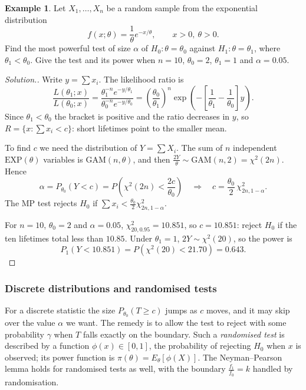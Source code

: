 \documentclass[12pt,a4paper]{report}
\theoremstyle{definition}
\newtheorem{example}[thm]{Example}
\theoremstyle{plain}
\newenvironment{solution}
  {\renewcommand{\qedsymbol}{}\begin{proof}[\textit{Solution}.]}
  {\end{proof}}
\begin{document}
\begin{example}
\label{ex:mpexponential}
Let $X_1,\dots,X_n$ be a random sample from the exponential distribution
\[f(x;\theta) = \frac{1}{\theta}e^{-x/\theta},\qquad x>0,\ \theta>0 .\]
Find the most powerful test of size $\alpha$ of $H_0\colon\theta = \theta_0$
against $H_1\colon\theta = \theta_1$, where $\theta_1<\theta_0$. Give the test
and its power when $n = 10$, $\theta_0 = 2$, $\theta_1 = 1$ and $\alpha = 0.05$.
\end{example}

\begin{solution}
Write $y = \sum x_i$. The likelihood ratio is
\[\frac{L(\theta_1;x)}{L(\theta_0;x)} = \frac{\theta_1^{-n}e^{-y/\theta_1}}{\theta_0^{-n}e^{-y/\theta_0}}
= \left(\frac{\theta_0}{\theta_1}\right)^n
\exp\left(-\left[\frac{1}{\theta_1} - \frac{1}{\theta_0}\right] y\right).\]
Since $\theta_1<\theta_0$ the bracket is positive and the ratio decreases in $y$,
so $R = \{x : \sum x_i<c\}$: short lifetimes point to the smaller mean.

To find $c$ we need the distribution of $Y = \sum X_i$. The sum of $n$ independent
$\text{EXP}(\theta)$ variables is $\text{GAM}(n,\theta)$, and then
$\frac{2Y}{\theta}\sim\text{GAM}(n,2) = \chi^2(2n)$. Hence
\[\alpha = P_{\theta_0}(Y<c) = P\left(\chi^2(2n)<\frac{2c}{\theta_0}\right)
\quad\Longrightarrow\quad c = \frac{\theta_0}{2}\,\chi^2_{2n,1-\alpha} .\]
The MP test rejects $H_0$ if $\sum x_i<\frac{\theta_0}{2}\chi^2_{2n,1-\alpha}$.

For $n = 10$, $\theta_0 = 2$ and $\alpha = 0.05$, $\chi^2_{20,0.95} = 10.851$, so
$c = 10.851$: reject $H_0$ if the ten lifetimes total less than $10.85$. Under
$\theta_1 = 1$, $2Y\sim\chi^2(20)$, so the power is
\[P_1(Y<10.851) = P\left(\chi^2(20)<21.70\right) = 0.643 .\]
\end{solution}

\subsubsection{Discrete distributions and randomised tests}

For a discrete statistic the size $P_{\theta_0}(T\ge c)$ jumps as $c$ moves, and it
may skip over the value $\alpha$ we want. The remedy is to allow the test to
reject with some probability $\gamma$ when $T$ falls exactly on the boundary. Such
a \emph{randomised test} is described by a function $\phi(x)\in[0,1]$, the
probability of rejecting $H_0$ when $x$ is observed; its power function is
$\pi(\theta) = E_\theta\left[\phi(X)\right]$. The Neyman--Pearson lemma holds for
randomised tests as well, with the boundary $\frac{f_1}{f_0} = k$ handled by
randomisation.
\end{document}

